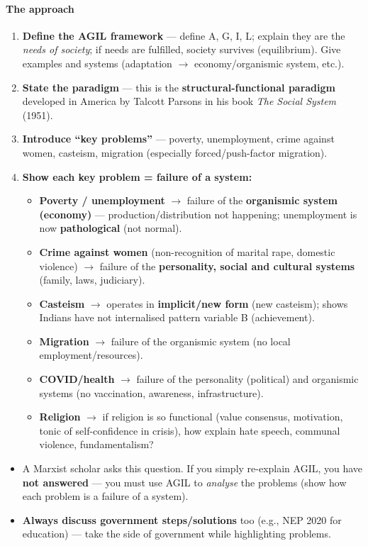\paragraph{The approach}
\begin{enumerate}
\item \textbf{Define the AGIL framework} --- define A, G, I, L; explain they are the \textit{needs of society}; if needs are fulfilled, society survives (equilibrium). Give examples and systems (adaptation $\rightarrow$ economy/organismic system, etc.).
\item \textbf{State the paradigm} --- this is the \textbf{structural-functional paradigm} developed in America by Talcott Parsons in his book \textit{The Social System} (1951).
\item \textbf{Introduce ``key problems''} --- poverty, unemployment, crime against women, casteism, migration (especially forced/push-factor migration).
\item \textbf{Show each key problem = failure of a system:}
\begin{itemize}
\item \textbf{Poverty / unemployment} $\rightarrow$ failure of the \textbf{organismic system (economy)} --- production/distribution not happening; unemployment is now \textbf{pathological} (not normal).
\item \textbf{Crime against women} (non-recognition of marital rape, domestic violence) $\rightarrow$ failure of the \textbf{personality, social and cultural systems} (family, laws, judiciary).
\item \textbf{Casteism} $\rightarrow$ operates in \textbf{implicit/new form} (new casteism); shows Indians have not internalised pattern variable B (achievement).
\item \textbf{Migration} $\rightarrow$ failure of the organismic system (no local employment/resources).
\item \textbf{COVID/health} $\rightarrow$ failure of the personality (political) and organismic systems (no vaccination, awareness, infrastructure).
\item \textbf{Religion} $\rightarrow$ if religion is so functional (value consensus, motivation, tonic of self-confidence in crisis), how explain hate speech, communal violence, fundamentalism?
\end{itemize}
\end{enumerate}

\begin{CriticalPoint}
\begin{itemize}
\item A Marxist scholar asks this question. If you simply re-explain AGIL, you have \textbf{not answered} --- you must use AGIL to \textit{analyse} the problems (show how each problem is a failure of a system).
\item \textbf{Always discuss government steps/solutions} too (e.g., NEP 2020 for education) --- take the side of government while highlighting problems.
\end{itemize}
\end{CriticalPoint}

